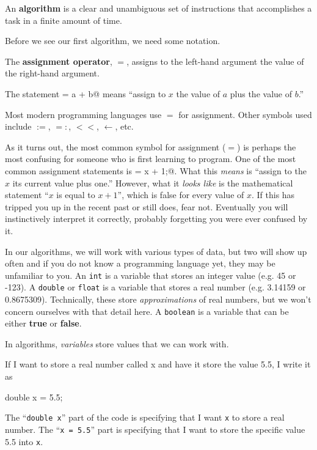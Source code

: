 \begin{df}
An {\bf algorithm} is a clear 
and unambiguous set of instructions
that accomplishes a task in a finite amount of time.
\end{df}

Before we see our first algorithm, we need some notation.

\begin{df}
The {\bf assignment operator}, $=$, assigns to the left-hand argument the value of the
right-hand argument.
\end{df}
\begin{exa}
The statement \verb@x = a + b@ means ``assign to $x$
the value of $a$ plus the value of $b$.''
\end{exa}

\begin{rem}
Most modern programming languages use $=$ for assignment.
Other symbols used include $:=$, $=:$, $<<$, $\leftarrow$, etc.

As it turns out, the most common symbol for assignment ($=$) is perhaps the most
confusing  for someone who is first learning to program. 
One of the most common assignment statements is \verb@x = x + 1;@.  
What this {\em means} is ``assign to the $x$ its current value plus one.''
However, what it {\em looks like} is the mathematical statement ``$x$ is equal to $x+1$'',
which is false for every value of $x$.  
If this has tripped you up in the recent past or still does,
fear not.  Eventually you will instinctively interpret it correctly, probably forgetting you
were ever confused by it.
\end{rem}
In our algorithms, we will work with various types of data,
but two will show up often and if you do not know a programming
language yet, they may be unfamiliar to you.
An \verb+int+ is a variable that stores an integer value 
(e.g. 45 or -123). A \verb+double+ or \verb+float+ is a
variable that stores a real number (e.g. 3.14159 or 
0.8675309). Technically, these store
{\em approximations} of real numbers, but we won't
concern ourselves with that detail here.
A \verb+boolean+ is a variable that can be either {\bf true} or {\bf false}.

In algorithms, {\em variables} store values that we can work with.

\begin{exa}
If I want to store a real number called x and have it store the value 5.5, I write it as
\begin{code}
double x = 5.5;
\end{code}
The ``\verb+double x+'' part of the code is specifying that I want \verb+x+ to store a real number. The ``\verb+x = 5.5+'' part is
specifying that I want to store the specific value 5.5 into \verb+x+.
\end{exa}

